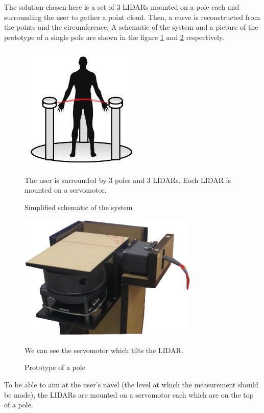 \documentclass{article}
\newcommand{\vsp}{\vspace{\baselineskip}}
\begin{document}
The solution chosen here is a set of 3 LIDARs mounted on a pole each and surrounding the user to gather a point cloud. Then, a curve is reconstructed from the points and the circumference. A schematic of the system and a picture of the prototype of a single pole are shown in the figure \ref{fig:schematic_system} and \ref{fig:photo_pole_prototype} respectively.

\vsp

\begin{figure}[H]
    \centering
    \includegraphics[height=6cm]{images/schematic_system.png}
    \caption[Simplified schematic of the system]{Simplified schematic of the system} {The user is surrounded by 3 poles and 3 LIDARs. Each LIDAR is mounted on a servomotor.}
    \label{fig:schematic_system}
\end{figure}

\begin{figure}[H]
    \centering
    \includegraphics[height=6cm]{images/photo_pole_prototype.jpg} 
    \caption[Prototype of a pole]{Prototype of a pole}{We can see the servomotor which tilts the LIDAR.}
    \label{fig:photo_pole_prototype}
\end{figure}

To be able to aim at the user's navel (the level at which the measurement should be made), the LIDARs are mounted on a servomotor each which are on the top of a pole.   
\end{document}
